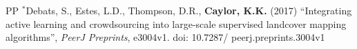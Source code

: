 \documentclass[10pt]{report}
\begin{document}
\begin{etaremune}
\item [PP] $^{*}$Debats, S., Estes, L.D., Thompson, D.R., \textbf{Caylor, K.K.} (2017) ``Integrating active learning and crowdsourcing into large-scale supervised landcover mapping algorithms'', {\em PeerJ Preprints}, e3004v1. doi: 10.7287/ peerj.preprints.3004v1

%
%
%
%
%
%
%
%

\end{etaremune}
\end{document}
